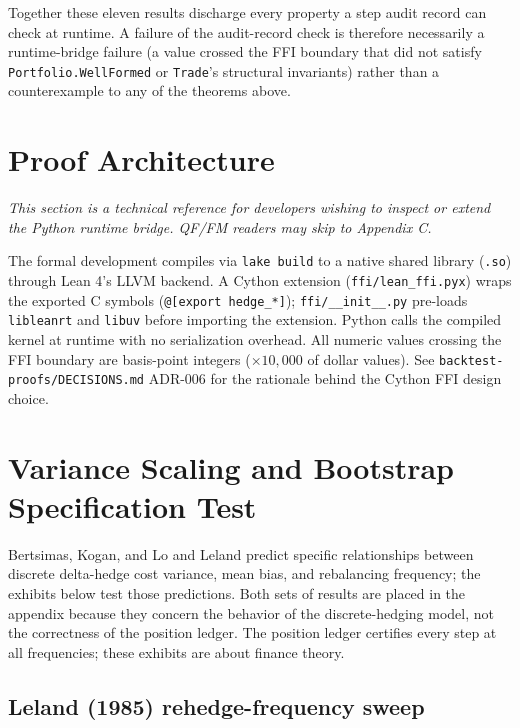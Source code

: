 \documentclass[
  11pt,
  letterpaper,
  DIV=12,
  numbers=noendperiod]{scrartcl}
\numberwithin{equation}{section}
\numberwithin{figure}{section}
\numberwithin{table}{section}
\let\quantproofsoldsection\section
\renewcommand{\section}{\clearpage\quantproofsoldsection}
\begin{document}
Together these eleven results discharge every property a step audit
record can check at runtime. A failure of the audit-record check is
therefore necessarily a runtime-bridge failure (a value crossed the FFI
boundary that did not satisfy \texttt{Portfolio.WellFormed} or
\texttt{Trade}'s structural invariants) rather than a counterexample to
any of the theorems above.

\section{Proof Architecture}\label{sec-appendix-architecture}

\emph{This section is a technical reference for developers wishing to
inspect or extend the Python runtime bridge. QF/FM readers may skip to
Appendix C.}

The formal development compiles via \texttt{lake\ build} to a native
shared library (\texttt{.so}) through Lean 4's LLVM backend. A Cython
extension (\texttt{ffi/lean\_ffi.pyx}) wraps the exported C symbols
(\texttt{@{[}export\ hedge\_*{]}}); \texttt{ffi/\_\_init\_\_.py}
pre-loads \texttt{libleanrt} and \texttt{libuv} before importing the
extension. Python calls the compiled kernel at runtime with no
serialization overhead. All numeric values crossing the FFI boundary are
basis-point integers (\(\times 10{,}000\) of dollar values). See
\texttt{backtest-proofs/DECISIONS.md} ADR-006 for the rationale behind
the Cython FFI design choice.

\section{Variance Scaling and Bootstrap Specification
Test}\label{sec-appendix-bootstrap}

Bertsimas, Kogan, and Lo  and Leland
 predict specific relationships between
discrete delta-hedge cost variance, mean bias, and rebalancing
frequency; the exhibits below test those predictions. Both sets of
results are placed in the appendix because they concern the behavior of
the discrete-hedging model, not the correctness of the position ledger.
The position ledger certifies every step at all frequencies; these
exhibits are about finance theory.

\subsection{Leland (1985) rehedge-frequency sweep}\label{sec-leland}
\end{document}

